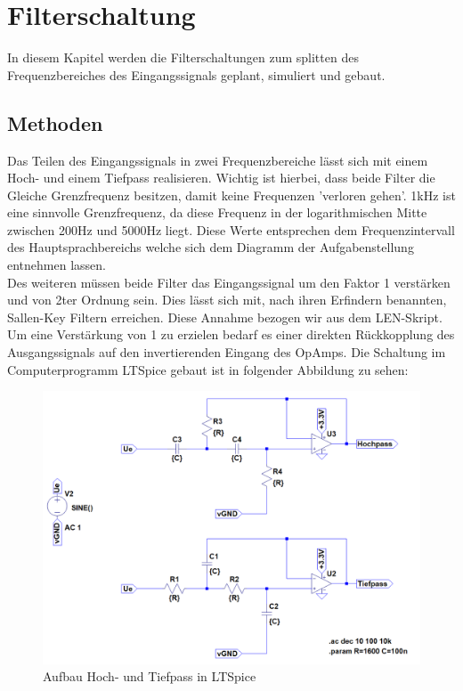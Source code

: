 \section{Filterschaltung}
In diesem Kapitel werden die Filterschaltungen zum splitten des Frequenzbereiches des Eingangssignals geplant, simuliert und gebaut.

\subsection{Methoden}
Das Teilen des Eingangssignals in zwei Frequenzbereiche lässt sich mit einem Hoch- und einem Tiefpass realisieren. Wichtig ist hierbei, dass beide Filter die Gleiche Grenzfrequenz besitzen, damit keine Frequenzen 'verloren gehen'. 1kHz ist eine sinnvolle Grenzfrequenz, da diese Frequenz in der logarithmischen Mitte zwischen 200Hz und 5000Hz liegt. Diese Werte entsprechen dem Frequenzintervall des Hauptsprachbereichs welche sich dem Diagramm\cite{Hoerbereichdiagramm} der Aufgabenstellung entnehmen lassen. \\
Des weiteren müssen beide Filter das Eingangssignal um den Faktor 1 verstärken und von 2ter Ordnung sein. Dies lässt sich mit, nach ihren Erfindern benannten, Sallen-Key Filtern erreichen.
Diese Annahme bezogen wir aus dem LEN-Skript.\\
Um eine Verstärkung von 1 zu erzielen bedarf es einer direkten Rückkopplung des Ausgangssignals auf den invertierenden Eingang des OpAmps. Die Schaltung im Computerprogramm LTSpice gebaut ist in folgender Abbildung zu sehen:

\begin{figure}[h]
	\centering
	\includegraphics[width=1\textwidth]{pics/SpiceSchaltungFilter.PNG}
	\caption{Aufbau Hoch- und Tiefpass in LTSpice}
\end{figure}

